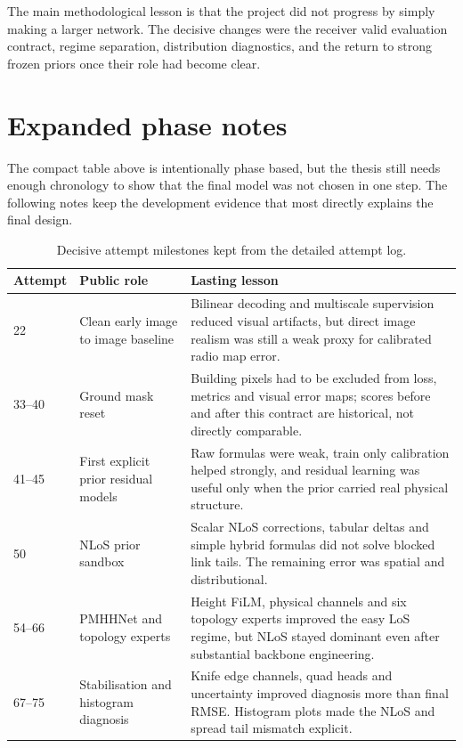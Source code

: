 The main methodological lesson is that the project did not progress by simply
making a larger network. The decisive changes were the receiver valid
evaluation contract, regime separation, distribution diagnostics, and the return
to strong frozen priors once their role had become clear.

\section{Expanded phase notes}

The compact table above is intentionally phase based, but the thesis still
needs enough chronology to show that the final model was not chosen in one
step. The following notes keep the development evidence that most directly
explains the final design.

\begin{table}[htbp]
\centering
\caption{Decisive attempt milestones kept from the detailed attempt log.}
\label{tab:expanded_attempt_milestones}
\scriptsize
\setlength{\tabcolsep}{3pt}
\begin{tabularx}{\textwidth}{p{}p{}X}
\toprule
Attempt & Public role & Lasting lesson \\
\midrule
22 & Clean early image to image baseline & Bilinear decoding and multiscale supervision reduced visual artifacts, but direct image realism was still a weak proxy for calibrated radio map error. \\
33--40 & Ground mask reset & Building pixels had to be excluded from loss, metrics and visual error maps; scores before and after this contract are historical, not directly comparable. \\
41--45 & First explicit prior residual models & Raw formulas were weak, train only calibration helped strongly, and residual learning was useful only when the prior carried real physical structure. \\
50 & NLoS prior sandbox & Scalar NLoS corrections, tabular deltas and simple hybrid formulas did not solve blocked link tails. The remaining error was spatial and distributional. \\
54--66 & PMHHNet and topology experts & Height FiLM, physical channels and six topology experts improved the easy LoS regime, but NLoS stayed dominant even after substantial backbone engineering. \\
67--75 & Stabilisation and histogram diagnosis & Knife edge channels, quad heads and uncertainty improved diagnosis more than final RMSE. Histogram plots made the NLoS and spread tail mismatch explicit. \\

\end{tabularx}
\end{table}
